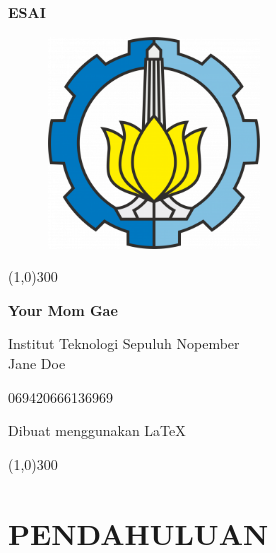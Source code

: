 \documentclass[a4paper,12pt]{article}
\title{}
\author{}
\date{}
\begin{document}
\begin{titlepage}
\begin{center}
 \textbf{ESAI}
 \vspace{1cm}
\end{center}
\begin{figure}[H]
 \centering
\includegraphics[width=0.5\textwidth]{its}\\
\end{figure}
\vspace{3cm}
\begin{center}
\line(1,0){300}

\textbf{Your Mom Gae}


Institut Teknologi Sepuluh Nopember
\\[1cm]
Jane Doe

069420666136969

Dibuat menggunakan \LaTeX\

\line(1,0){300}\\
\end{center}
\end{titlepage}
\tableofcontents
\thispagestyle{empty}
\cleardoublepage
\setcounter{page}{1}
 \section{\textbf{PENDAHULUAN}}
\vspace{1cm}
\end{document}
